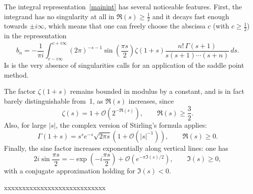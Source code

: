 \documentclass{amsart}
\begin{document}
The integral representation~\eqref{mainint} has several noticeable features. 
First, the integrand has no singularity at all in $\Re(s)\ge\frac12$
and it decays fast enough towards $\pm i \infty$,
which means that one can freely choose the abscissa $c$ (with $c\geq\frac12$)
in the representation 
\begin{equation}\label{mainint2}
b_n = -\frac{1}{\pi i} 
\int_{c-i\infty}^{c+i\infty} 
(2\pi)^{-s-1} \sin\left(\frac{\pi s}{2}\right)\zeta(1+s)
\frac{n!\, \Gamma(s+1)}{s(s+1)\cdots(s+n)}\, ds.
\end{equation}
Is is the very absence of singularities calls for an application 
of the saddle  point method.

The factor $\zeta(1+s)$ remains bounded in modulus by a constant,
and is in fact barely distinguishable from~1, as $\Re(s)$ increases,
since
\begin{equation}\label{zetapp}
\zeta(s)=1+\mathcal{O}\left(2^{-\Re(s)}\right), \qquad \Re(s)\ge\frac32.
\end{equation}
Also, for large $|s|$, the complex version of Stirling's formula 
applies:
\begin{equation}\label{stirapp}
\Gamma(1+s) = s^s e^{-s}\sqrt{2\pi s}\left(1+\mathcal{O}(|s|^{-1})\right),\qquad \Re(s)\ge0.
\end{equation}
Finally, the sine factor increases exponentially along vertical lines:
one has
\begin{equation}\label{sinapp}
2i\sin\frac{\pi s}{2} =-\exp\left(-i\frac{\pi s}{2}\right)
+\mathcal{O}\left(e^{-\pi \Im(s)/2}\right), \qquad \Im(s)\ge0,
\end{equation}
with a conjugate approximation holding for $\Im(s)<0$.

xxxxxxxxxxxxxxxxxxxxxxxxxxxx
\end{document}
